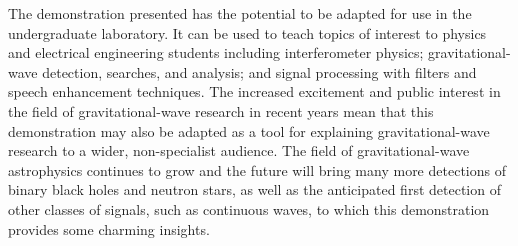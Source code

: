 \documentclass[paper-main.tex]{subfiles}
\begin{document}
The demonstration presented has the potential to be adapted for use in the undergraduate laboratory.
It can be used to teach topics of interest to physics and electrical engineering students including interferometer physics; gravitational-wave detection, searches, and analysis; and signal processing with filters and speech enhancement techniques. 
The increased excitement and public interest in the field of gravitational-wave research in recent years mean that this demonstration may also be adapted as a tool for explaining gravitational-wave research to a wider, non-specialist audience. 
The field of gravitational-wave astrophysics continues to grow and the future will bring many more detections of binary black holes and neutron stars, as well as the anticipated first detection of other classes of signals, such as continuous waves, to which this demonstration provides some charming insights. 




\end{document}
